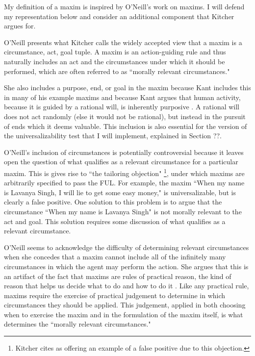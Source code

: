 \begin{isabellebody}
\begin{isamarkuptext}
My definition of a maxim is inspired by O'Neill's work on maxims. I will defend my representation
below and consider an additional component that Kitcher argues for.%
\end{isamarkuptext}\isamarkuptrue%
%
\isadelimdocument
%
\endisadelimdocument
%
\isatagdocument
%
\isamarkuptrue%
%
\endisatagdocument
{\isafolddocument}%
%
\isadelimdocument
%
\endisadelimdocument
%
\begin{isamarkuptext}%
O'Neill \cite[37]{actingonprinciple} presents what Kitcher \cite{whatisamaxim}  calls the widely accepted 
view that a maxim is a circumstance, act, goal tuple. A maxim 
is an action-guiding rule and thus naturally includes an act and the circumstances under which 
it should be performed, which are often referred to as ``morally relevant circumstances." 

She also includes a purpose, end, or goal in the maxim because Kant includes this in many of his 
example maxims and because Kant argues that human activity, because it is guided by a rational will, 
is inherently purposive \cite[4:428]{groundwork}. A rational will does not act randomly (else it would not be rational), 
but instead in the pursuit of ends which it deems valuable. This inclusion is also essential for the version of the universalizability test 
that I will implement, explained in Section ??.

O'Neill's inclusion of circumstances is potentially controversial because it leaves open the question of what qualifies as a 
relevant circumstance for a particular maxim. This is gives rise to ``the tailoring objection" \cite[217]{whatisamaxim} \footnote{Kitcher
cites \cite{kantsethicalthought}  as offering an example of a false positive due to this objection.}, 
under which maxims are arbitrarily specified to pass the FUL. For example, the maxim ``When my name is Lavanya Singh,
I will lie to get some easy money," is universalizable, but is clearly a false positive. One solution to 
this problem is to argue that the circumstance ``When my name is Lavanya Singh" is not morally relevant 
to the act and goal. This solution requires some discussion of what qualifies as a relevant circumstance.

O'Neill seems to acknowledge the difficulty of determining relevant circumstances when she concedes that a maxim cannot include all 
of the infinitely many circumstances in which the agent may perform the action\cite[4:428]{actingonprinciple}. She argues that this is 
an artifact of the fact that maxims are rules of practical reason, the kind of reason that helps us decide what to do 
and how to do it \cite{bok}. Like any practical rule, 
maxims require the exercise of practical judgement to determine in which circumstances they should be applied. 
This judgement, applied in both choosing when to exercise the maxim and in the formulation of the maxim 
itself, is what determines the ``morally relevant circumstances."


\end{isamarkuptext}
\end{isabellebody}
